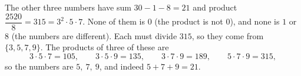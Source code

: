 The other three numbers have sum $30-1-8=21$ and product $\dfrac{2520}{8}=315=3^2\cdot5\cdot7$. None of them is $0$ (the product is not $0$), and none is $1$ or $8$ (the numbers are different). Each must divide $315$, so they come from $\{3,5,7,9\}$. The products of three of these are
\[3\cdot5\cdot7=105,\qquad3\cdot5\cdot9=135,\qquad3\cdot7\cdot9=189,\qquad5\cdot7\cdot9=315,\]
so the numbers are $\boxed{5,\ 7,\ 9}$, and indeed $5+7+9=21$.
